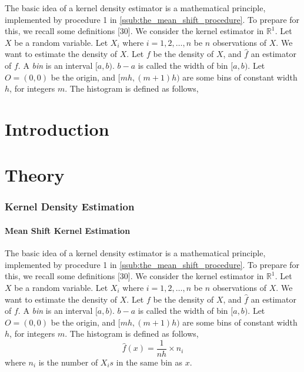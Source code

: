 \label{ch:mean_shift}
The basic idea of a kernel density estimator is a mathematical principle, 
implemented by procedure 1 in \ref{ssub:the_mean_shift_procedure}. To prepare
for this, we recall some definitions [30]. We consider the kernel estimator in
$\mathbb{R}^1$. Let $X$ be a random variable. Let $X_i$ where $i=1,2,\ldots,n$ be
$n$ observations of $X$. We want to estimate the density  of $X$. Let $f$ be the
density of $X$, and $\hat{f}$ an estimator of $f$. A \emph{bin} is an interval
$[a,b)$. $b-a$ is called the width of bin $[a,b)$. Let $O=(0,0)$ be the origin, 
and $[mh, (m+1)h)$ are some bins of constant width $h$, for integers $m$. The
histogram is defined as follows,

\section{Introduction} %
\label{sec:introduction}

\section{Theory} %
\label{sec:theory}



\subsubsection{Kernel Density Estimation} %
\label{ssub:the_kernel_density_estimator}

\paragraph{Mean Shift Kernel Estimation} %
\label{par:mean_shift_kernel_estimation}


The basic idea of a kernel density estimator is a mathematical principle, 
implemented by procedure 1 in \ref{ssub:the_mean_shift_procedure}. To prepare
for this, we recall some definitions [30]. We consider the kernel estimator in
$\mathbb{R}^1$. Let $X$ be a random variable. Let $X_i$ where $i=1,2,\ldots,n$ be
$n$ observations of $X$. We want to estimate the density  of $X$. Let $f$ be the
density of $X$, and $\hat{f}$ an estimator of $f$. A \emph{bin} is an interval
$[a,b)$. $b-a$ is called the width of bin $[a,b)$. Let $O=(0,0)$ be the origin, 
and $[mh, (m+1)h)$ are some bins of constant width $h$, for integers $m$. The
histogram is defined as follows,
\begin{equation}\label{eq:histogram}
	\hat{f}(x)=\frac{1}{nh} \times n_i
\end{equation}
where $n_i$ is the number of $X_i s$ in the same bin as $x$.

